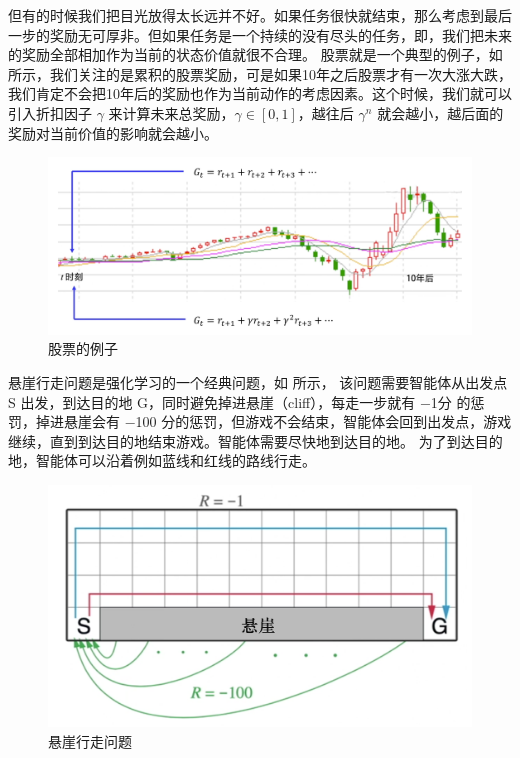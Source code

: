 但有的时候我们把目光放得太长远并不好。如果任务很快就结束，那么考虑到最后一步的奖励无可厚非。但如果任务是一个持续的没有尽头的任务，即，我们把未来的奖励全部相加作为当前的状态价值就很不合理。
股票就是一个典型的例子，如 所示，我们关注的是累积的股票奖励，可是如果10年之后股票才有一次大涨大跌，我们肯定不会把10年后的奖励也作为当前动作的考虑因素。这个时候，我们就可以引入折扣因子 $\gamma$ 来计算未来总奖励，$\gamma \in [0,1]$，越往后 $\gamma^n$ 就会越小，越后面的奖励对当前价值的影响就会越小。

\begin{figure}[htb]
	\centering
	\includegraphics[width=0.5\linewidth]{res/ch3/3.6}
	\caption{股票的例子}
	\label{fig:fig3.6}
\end{figure}

悬崖行走问题是强化学习的一个经典问题，如 所示，
该问题需要智能体从出发点 S 出发，到达目的地 G，同时避免掉进悬崖（cliff），每走一步就有 $-$1分 的惩罚，掉进悬崖会有 $-$100 分的惩罚，但游戏不会结束，智能体会回到出发点，游戏继续，直到到达目的地结束游戏。智能体需要尽快地到达目的地。
为了到达目的地，智能体可以沿着例如蓝线和红线的路线行走。

\begin{figure}[htb]
	\centering
	\includegraphics[width=0.5\linewidth]{res/ch3/3.7}
	\caption{悬崖行走问题}
	\label{fig:cliff}
\end{figure}



